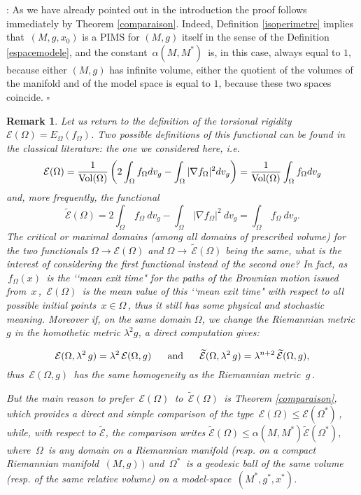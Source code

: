 \documentclass[11pt, reqno]{amsart}
\newtheorem{remarque}[theoreme]{Remark}
\theoremstyle{plain}
\begin{document}
:
\noindent As we have already pointed out in the introduction  the proof   follows immediately by Theorem \ref{comparaison}.
Indeed, Definition \ref{isoperimetre}  implies that $\,(M , g, x_0)$ is a 
PIMS for $(M,g)$ itself in the sense of the Definition \ref{espacemodele},
and  the constant $\,\alpha (M, M^*)\,$ is, in this case, always equal to $1$, 
because either $(M, g)$ 
has infinite volume, either the quotient of the volumes of the manifold and of the model space
is equal to $1$, because these two spaces coincide. $\square$
 \begin{remarque}\rm\label{explanation}
Let us return to the definition of the torsional rigidity
${\mathcal E} (\Omega) = E_\Omega  (f_\Omega)$. Two possible
definitions of this functional can be found in the classical literature: the one we considered here, i.e.
$${\mathcal E} (\Omega) =  \dfrac{1}{{\rm Vol} (\Omega)} \left(2 \int_\Omega  f_{\Omega} dv_g -\int_\Omega |\nabla f_\Omega|^2  dv_g\right)
=  \dfrac{1}{{\rm Vol} (\Omega)}  \int_\Omega f_\Omega dv_g $$
and, more frequently, the functional
$$\widetilde {\mathcal E} (\Omega) = 2 \int_\Omega \, f_\Omega\ dv_g
- \int_\Omega \,|\nabla f_\Omega|^2 \ dv_g =  \int_\Omega \, f_\Omega\ dv_g.$$
The critical or maximal domains (among all domains of prescribed volume) for the two functionals $\Omega \rightarrow {\mathcal E} (\Omega)$ and $\Omega \rightarrow \,\widetilde {\mathcal E} (\Omega)$ being the same, what is the interest of considering the first functional instead of the second one?
In fact, as $\,f_\Omega (x) \,$ is the 
\lq \lq mean exit time" for the paths of the Brownian motion issued from $\,x\,$,
$\,{\mathcal E} (\Omega) \,$ is the mean value of this \lq \lq mean exit time" with respect to all
possible initial points $\, x \in \Omega\,$, thus it still has some physical and stochastic 
meaning. 
Moreover if, on the same domain $\Omega$, we change the Riemannian metric $g$ in the homothetic metric $\lambda^2 g$, a direct computation gives: 

\begin{equation}\label{homogeneite}
{\mathcal E} (\Omega , \lambda^2 \, g) = \lambda^2 \, {\mathcal E} (\Omega , g)\ \ \ \ \ {\rm and}
\ \ \ \ \ \widetilde {\mathcal E} (\Omega , \lambda^2 \, g) = \lambda^{n+2} \,
\widetilde  {\mathcal E} (\Omega , g),
\end{equation}
thus $\,{\mathcal E} (\Omega , g)\,$ has the same homogeneity as the Riemannian metric $\,g\,$.

But the main reason to prefer $\,{\mathcal E} (\Omega) \,$ to
$\,\widetilde {\mathcal E} (\Omega) \,$  is  Theorem
\ref{comparaison}, which provides a direct and simple comparison of the type 
$\,{\mathcal E} (\Omega) \le {\mathcal E} (\Omega^*) \,$, 
while, with respect to $\widetilde {\mathcal E}$, the comparison writes $\widetilde {\mathcal E}(\Omega) \leq \alpha(M, M^*) \widetilde {\mathcal E}(\Omega^*)$, 
where $\,\Omega\,$ is any domain on a Riemannian manifold (resp. on a compact Riemannian manifold $\,(M,g)\,)$ and 
$\,\Omega^*\,$ is a geodesic ball of the same volume (resp. of the same relative volume) 
on a model-space $\,(M^*, g^*, x^*)$.
\end{remarque}
\end{document}
